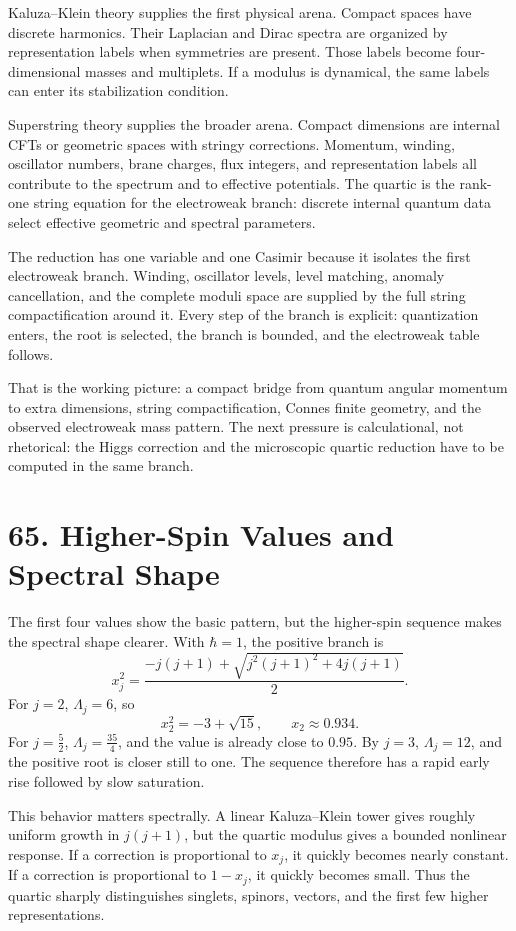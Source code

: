 \documentclass[11pt]{article}
\newcommand{\Lspin}{\Lambda_j}
\newcommand{\hb}{\hbar}
\begin{document}
Kaluza--Klein theory supplies the first physical arena. Compact spaces have discrete harmonics. Their Laplacian and Dirac spectra are organized by representation labels when symmetries are present. Those labels become four-dimensional masses and multiplets. If a modulus is dynamical, the same labels can enter its stabilization condition.

Superstring theory supplies the broader arena. Compact dimensions are internal CFTs or geometric spaces with stringy corrections. Momentum, winding, oscillator numbers, brane charges, flux integers, and representation labels all contribute to the spectrum and to effective potentials. The quartic is the rank-one string equation for the electroweak branch: discrete internal quantum data select effective geometric and spectral parameters.

The reduction has one variable and one Casimir because it isolates the first electroweak branch. Winding, oscillator levels, level matching, anomaly cancellation, and the complete moduli space are supplied by the full string compactification around it. Every step of the branch is explicit: quantization enters, the root is selected, the branch is bounded, and the electroweak table follows.

That is the working picture: a compact bridge from quantum angular momentum to extra dimensions, string compactification, Connes finite geometry, and the observed electroweak mass pattern. The next pressure is calculational, not rhetorical: the Higgs correction and the microscopic quartic reduction have to be computed in the same branch.

\section*{65. Higher-Spin Values and Spectral Shape}

The first four values show the basic pattern, but the higher-spin sequence makes the spectral shape clearer. With \(\hb=1\), the positive branch is
\[
        x_j^2=
        \frac{-j(j+1)+\sqrt{j^2(j+1)^2+4j(j+1)}}{2}.
\]
For \(j=2\), \(\Lspin=6\), so
\[
        x_2^2=-3+\sqrt{15},
        \qquad
        x_2\approx0.934 .
\]
For \(j=\frac52\), \(\Lspin=\frac{35}{4}\), and the value is already close to \(0.95\). By \(j=3\), \(\Lspin=12\), and the positive root is closer still to one. The sequence therefore has a rapid early rise followed by slow saturation.

This behavior matters spectrally. A linear Kaluza--Klein tower gives roughly uniform growth in \(j(j+1)\), but the quartic modulus gives a bounded nonlinear response. If a correction is proportional to \(x_j\), it quickly becomes nearly constant. If a correction is proportional to \(1-x_j\), it quickly becomes small. Thus the quartic sharply distinguishes singlets, spinors, vectors, and the first few higher representations.
\end{document}
